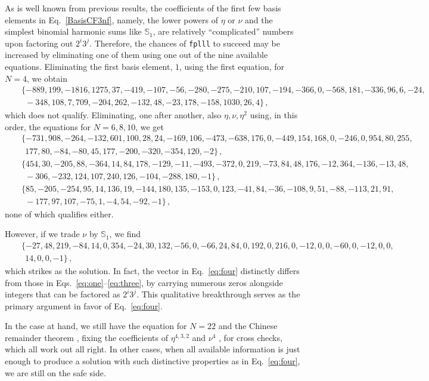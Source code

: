 \documentclass[
 twocolumn,
 superscriptaddress,
 preprintnumbers,
 nofootinbib,
 amsmath,amssymb,
 aps,
 prl
 ]{revtex4-2}
\newcommand{\BS}{\mathbb{S}}
\begin{document}
\begin{widetext}
As is well known from previous results, the coefficients of the first few basis elements in Eq.~\eqref{BasisCF3nf}, namely, the lower powers of $\eta$ or $\nu$ and the simplest binomial harmonic sums like $\BS_{1}$, are relatively ``complicated'' numbers upon factoring out $2^i3^j$.
Therefore, the chances of \texttt{fplll} to succeed may be increased by eliminating one of them using one out of the nine available equations.
Eliminating the first basis element, $1$, using the first equation, for $N=4$, we obtain
\begin{eqnarray}
&&\{-889,199,-1816,1275,37,-419,-107,-56,-280,-275,-210,107,-194,-366,0,-568,181,-336,96,6,-24,\nonumber\\&&\ \
  -348,108,7,709,-204,262,-132,48,-23,178,-158,1030,26,4\}\,,
\label{eq:two}
\end{eqnarray}
which does not qualify.
Eliminating, one after another, also $\eta,\nu,\eta^2$ using, in this order, the equations for $N=6,8,10$, we get
\begin{eqnarray}
  &&\{-731,908,-264,-132,601,100,28,24,-169,106,-473,-638,176,0,-449,154,168,0,-246,0,954,80,255,
  \nonumber\\&&\ \
  177,80,-84,-80,45,177,-200,-320,-354,120,-2\}\,,\nonumber\\
&&\{454,30,-205,88,-364,14,84,178,-129,-11,-493,-372,0,219,-73,84,48,176,-12,364,-136,-13,48,\nonumber\\&&\ \
  -306,-232,124,107,240,126,-104,-288,180,-1\}\,,\nonumber\\
 &&\{85,-205,-254,95,14,136,19,-144,180,135,-153,0,123,-41,84,-36,-108,9,51,-88,-113,21,91,\nonumber\\&&\ \
  -177,97,107,-75,1,-4,54,-92,-1\}\,,
\label{eq:three}
\end{eqnarray}
none of which qualifies either.

However, if we trade $\nu$ by $\BS_{1}$, we find
\begin{eqnarray}
&&\{-27,48,219,-84,14,0,354,-24,30,132,-56,0,-66,24,84,0,192,0,216,0,-12,0,0,-60,0,-12,0,0,\nonumber\\&&\ \
14,0,0,-1\}\,,
\label{eq:four}
\end{eqnarray}
which strikes as the solution.
In fact, the vector in Eq.~\eqref{eq:four} distinctly differs from those in Eqs.~\eqref{eq:one}--\eqref{eq:three}, by carrying numerous zeros alongside integers that can be factored as $2^i3^j$.
This qualitative breakthrough serves as the primary argument in favor of Eq.~\eqref{eq:four}.

In the case at hand, we still have the equation for $N=22$ \cite{Falcioni:2025hfz} and the Chinese remainder theorem \cite{china}, fixing the coefficients of $\eta^{4,3,2}$ and $\nu^4$ \cite{Moch:2014sna}, for cross checks, which all work out all right.
In other cases, when all available information is just enough to produce a solution with such distinctive properties as in Eq.~\eqref{eq:four}, we are still on the safe side.


\end{widetext}
\end{document}
